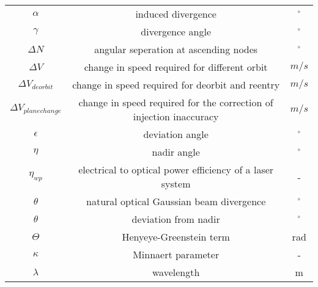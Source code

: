 \begin{center}
\begin{longtable}{c|c|c}
$\alpha$                            & induced divergence                       																& $^\circ$ \\

$\gamma$                            & divergence angle                         																& $^\circ$ \\

$\Delta N$                          & angular seperation at ascending nodes            												& $^\circ$ \\   

$\Delta V$                          & change in speed required for different orbit 														& $m/s$ \\

$\Delta V_{deorbit}$                & change in speed required for deorbit and reentry  											& $m/s$ \\ 

$\Delta V_{planechange}$            & change in speed required for the correction of injection inaccuracy			& $m/s$ \\ 

$\epsilon$                         	& deviation angle                          																& $^\circ$ \\

$\eta$ 															& nadir angle																															& $^\circ$ \\

$\eta_{wp}$                       	& electrical to optical power efficiency of a laser system  							& - \\

$\theta$                            & natural optical Gaussian beam divergence       													& $^\circ$ \\

$\theta$                            & deviation from nadir                             												&  $^\circ$ \\

$\Theta$                            & Henyeye-Greenstein term                           											& rad \\

$\kappa$                            & Minnaert parameter                  																		& - \\

$\lambda$ 													& wavelength																															& m \\


\end{longtable}
\end{center}
